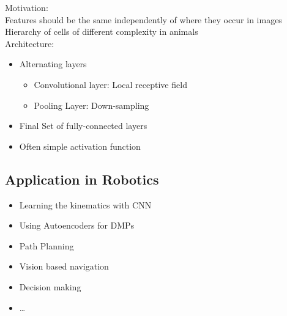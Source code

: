Motivation:\\
Features should be the same independently of where they occur in images\\
Hierarchy of cells of different complexity in animals\\

Architecture:\\
\begin{itemize}
\item Alternating layers
  \begin{itemize}
  \item Convolutional layer: Local receptive field
  \item Pooling Layer: Down-sampling
  \end{itemize}
\item Final Set of fully-connected layers
\item Often simple activation function
\end{itemize}


\subsection{Application in Robotics}%
\label{nn:sub:application_in_robotics}
\begin{itemize}
\item Learning the kinematics with CNN
\item Using Autoencoders for DMPs
\item Path Planning
\item Vision based navigation
\item Decision making
\item \ldots
\end{itemize}